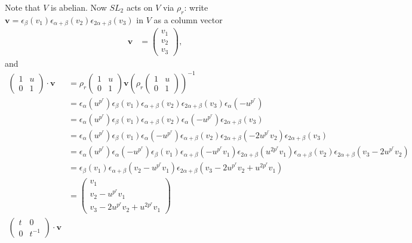Note that $V$ is abelian. Now $SL_2$ acts on $V$ via $\rho_r$: write $\mathbf{v} = \epsilon_ \beta (v_1)\epsilon_{\alpha+\beta}(v_2) \epsilon_{2\alpha+\beta}(v_3)$ in $V$ as a column vector
\begin{align*}
\mathbf{v} &= \left(\begin{matrix} v_1 \\ v_2 \\ v_3 \end{matrix}\right),
\end{align*}
and
\begin{align*}
\left(\begin{matrix} 1 & u \\ 0 & 1\end{matrix}\right) \cdot \mathbf{v} 
&= 
\rho_r\left(\begin{matrix} 1 & u \\ 0 & 1\end{matrix}\right) \mathbf{v}\left( \rho_r\left(\begin{matrix} 1 & u \\ 0 & 1\end{matrix}\right)\right)^{-1} \\
&=
\epsilon_ \alpha (u^{p^r}) \epsilon_ \beta (v_1)\epsilon_{\alpha+\beta}(v_2) \epsilon_{2\alpha+\beta}(v_3) \epsilon_ \alpha (-u^{p^r}) \\
&=
\epsilon_ \alpha (u^{p^r}) \epsilon_ \beta (v_1) \epsilon_{\alpha+\beta}(v_2) \epsilon_ \alpha (-u^{p^r}) \epsilon_{2\alpha+\beta}(v_3) \\
&=
\epsilon_ \alpha (u^{p^r}) \epsilon_ \beta (v_1)  \epsilon_ \alpha (-u^{p^r}) \epsilon_{\alpha+\beta}(v_2) \epsilon_{2\alpha+\beta}(-2u^{p^r}v_2)\epsilon_{2\alpha+\beta}(v_3)\\
&=
\epsilon_ \alpha (u^{p^r}) \epsilon_ \alpha (-u^{p^r})  \epsilon_ \beta (v_1) \epsilon_{\alpha+\beta}(-u^{p^r}v_1) \epsilon_{2\alpha+\beta}(u^{2p^r}v_1) \epsilon_{\alpha+\beta}(v_2) \epsilon_{2\alpha+\beta}(v_3-2u^{p^r}v_2)\\
&=
\epsilon_ \beta (v_1)  \epsilon_{\alpha+\beta}(v_2-u^{p^r}v_1) \epsilon_{2\alpha+\beta}(v_3-2u^{p^r}v_2 + u^{2p^r}v_1)\\
&= \left(\begin{matrix} v_1 \\ v_2-u^{p^r}v_1 \\ v_3-2u^{p^r}v_2 + u^{2p^r}v_1 \end{matrix}\right) \\
\left(\begin{matrix} t & 0 \\ 0 & t^{-1}\end{matrix}\right) \cdot \mathbf{v} 

\end{align*}
